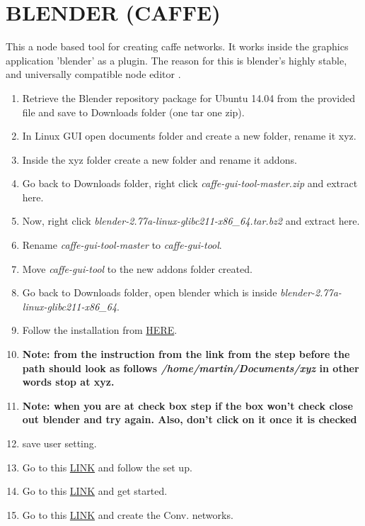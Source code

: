 \documentclass[12pt]{article}
\begin{document}
\section{BLENDER (CAFFE)}
This a node based tool for creating caffe networks. It works inside the graphics application 'blender' as a plugin. The reason for this is blender's highly stable, and universally compatible node editor \cite{caffe-gui}.
\begin{enumerate}
  \item Retrieve the Blender repository package for Ubuntu 14.04 from the provided file and save to Downloads folder (one tar one zip).
  \item In Linux GUI open documents folder and create a new folder, rename it xyz.
  \item Inside the xyz folder create a new folder and rename it addons.
  \item Go back to Downloads folder, right click \emph{caffe-gui-tool-master.zip} and extract here.
  \item Now, right click \emph{blender-2.77a-linux-glibc211-x86\_64.tar.bz2} and extract here.
  \item Rename \emph{caffe-gui-tool-master} to \emph{caffe-gui-tool}.
  \item Move \emph{caffe-gui-tool} to the new addons folder created.
  \item Go back to Downloads folder, open blender which is inside \emph{blender-2.77a-linux-glibc211-x86\_64}.
  \item Follow the installation from \href{https://github.com/Chasvortex/caffe-gui-tool/wiki/Installation}{HERE}.
  \item \textbf{Note: from the instruction from the link from the step before the path should look as follows \emph{/home/martin/Documents/xyz} in other words stop at xyz.}
  \item \textbf{Note: when you are at check box step if the box won't check close out blender and try again. Also, don't click on it once it is checked}
  \item save user setting.
  \item Go to this \href{https://github.com/Chasvortex/caffe-gui-tool/wiki/Setup}{LINK} and follow the set up.
  \item Go to this \href{https://github.com/Chasvortex/caffe-gui-tool/wiki/Getting-Started}{LINK} and get started.
  \item Go to this \href{https://github.com/Chasvortex/caffe-gui-tool/wiki/IO-and-Usage}{LINK} and create the Conv. networks.
\end{enumerate}
\end{document}
